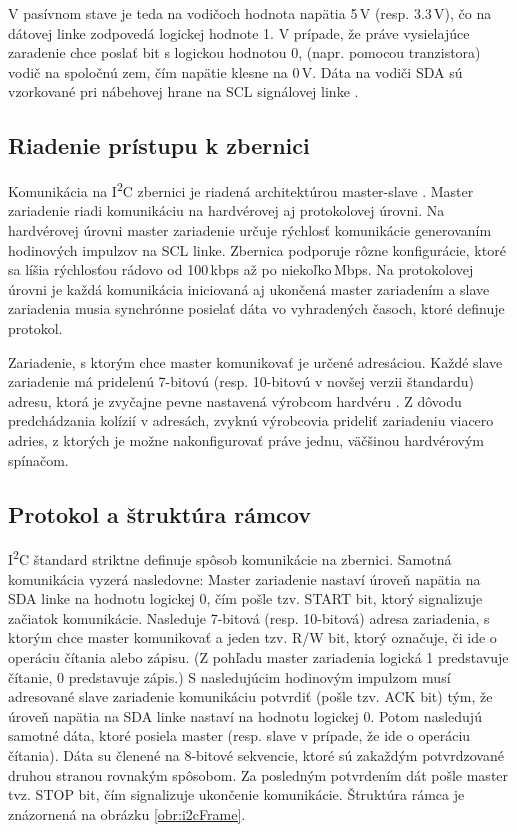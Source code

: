 V pasívnom stave je teda na vodičoch hodnota napätia 5\,V (resp. 3.3\,V), čo na dátovej linke zodpovedá logickej hodnote 1. V prípade, že práve vysielajúce zaradenie chce poslať bit s logickou hodnotou 0,  (napr. pomocou tranzistora) vodič na spoločnú zem, čím napätie klesne na 0\,V. Dáta na vodiči SDA sú vzorkované pri nábehovej hrane na SCL signálovej linke \cite{i2cSpec}.

\subsection{Riadenie prístupu k zbernici}
Komunikácia na I\textsuperscript{2}C zbernici je riadená architektúrou master-slave \cite{i2cSpec}. Master zariadenie riadi komunikáciu na hardvérovej aj protokolovej úrovni. Na hardvérovej úrovni master zariadenie určuje rýchlosť komunikácie generovaním hodinových impulzov na SCL linke. Zbernica podporuje rôzne konfigurácie, ktoré sa líšia rýchlosťou rádovo od 100\,kbps až po niekoľko\,Mbps. Na protokolovej úrovni je každá komunikácia iniciovaná aj ukončená master zariadením a slave zariadenia musia synchrónne posielať dáta vo vyhradených časoch, ktoré definuje protokol.

Zariadenie, s ktorým chce master komunikovať je určené adresáciou. Každé slave zariadenie má pridelenú 7-bitovú (resp. 10-bitovú v novšej verzii štandardu) adresu, ktorá je zvyčajne pevne nastavená výrobcom hardvéru \cite{i2cSpec}. Z dôvodu predchádzania kolízií v adresách, zvyknú výrobcovia prideliť zariadeniu viacero adries, z ktorých je možne nakonfigurovať práve jednu, väčšinou hardvérovým spínačom.

\subsection{Protokol a štruktúra rámcov}
I\textsuperscript{2}C štandard striktne definuje spôsob komunikácie na zbernici. Samotná komunikácia vyzerá nasledovne: Master zariadenie nastaví úroveň napätia na SDA linke na hodnotu logickej 0, čím pošle tzv. START bit, ktorý signalizuje začiatok komunikácie. Nasleduje 7-bitová (resp. 10-bitová) adresa zariadenia, s ktorým chce master komunikovať a jeden tzv. R/W bit, ktorý označuje, či ide o operáciu čítania alebo zápisu. (Z pohľadu master zariadenia logická 1 predstavuje čítanie, 0 predstavuje zápis.) S nasledujúcim hodinovým impulzom musí adresované slave zariadenie komunikáciu potvrdiť (pošle tzv. ACK bit) tým, že úroveň napätia na SDA linke nastaví na hodnotu logickej 0. Potom nasledujú samotné dáta, ktoré posiela master (resp. slave v prípade, že ide o operáciu čítania). Dáta su členené na 8-bitové sekvencie, ktoré sú zakaždým potvrdzované druhou stranou rovnakým spôsobom. Za posledným potvrdením dát pošle master tvz. STOP bit, čím signalizuje ukončenie komunikácie. Štruktúra rámca je znázornená na obrázku \ref{obr:i2cFrame}.

